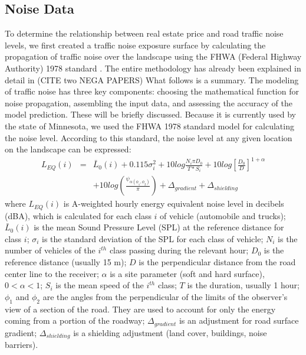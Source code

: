 \documentclass{article}\usepackage{graphicx, color}
\begin{document}
\subsection{Noise Data}
To determine the relationship between real estate price and road traffic noise levels, we first created a traffic noise exposure surface by calculating the propagation of traffic noise over the landscape using the FHWA (Federal Highway Authority) 1978 standard \citep{Barry1978}. The entire methodology has already been explained in detail in (CITE two NEGA PAPERS) What follows is a summary. The modeling of traffic noise has three key components: choosing the mathematical function for noise propagation, assembling the input data, and assessing the accuracy of the model prediction. These will be briefly discussed.  Because it is currently used by the state of Minnesota, we used the FHWA 1978 standard model for calculating the noise level.  According to this standard, the noise level at any given location on the landscape can be expressed:  
\begin{eqnarray}\label{eq:noise}
L_{EQ}(i) &=& \bar{L}_0(i) + 0.115 \sigma _i^2 + 10 log \frac{N_i \pi D_0}{T*S_i} + 10 log \left[ \frac{D_0}{D}\right]^{1 + \alpha}  \nonumber \\
&& + 10 log \left( \frac{\psi _{\alpha (\phi _1, \phi _2)}}{\pi}\right) + \Delta _{gradient} + \Delta _{shielding}
\end{eqnarray}
where $L_{EQ}(i)$ is A-weighted hourly energy equivalent noise level in decibels (dBA), which is calculated for each class $i$ of vehicle (automobile and trucks); $\bar{L}_0(i)$ is the mean Sound Pressure Level (SPL) at the reference distance for class $i$; $\sigma _i$ is the standard deviation of the SPL for each class of vehicle; $N_i$ is the number of vehicles of the $i^{th}$ class passing during the relevant hour; $D_0$ is the reference distance (usually 15 m); $D$ is the perpendicular distance from the road center line to the receiver; $\alpha$ is a site parameter (soft and hard surface), $0 < \alpha < 1$; $S_i$ is the mean speed of the $i^{th}$ class; $T$ is the duration, usually 1 hour; $\phi _1$ and $\phi _2$ are the angles from the perpendicular of the limits of the observer's view of a section of the road. They are used to account for only the energy coming from a portion of the roadway; $\Delta _{gradient}$ is an adjustment for road surface gradient; $\Delta _{shielding}$ is a shielding adjustment (land cover, buildings, noise barriers).
\end{document}
